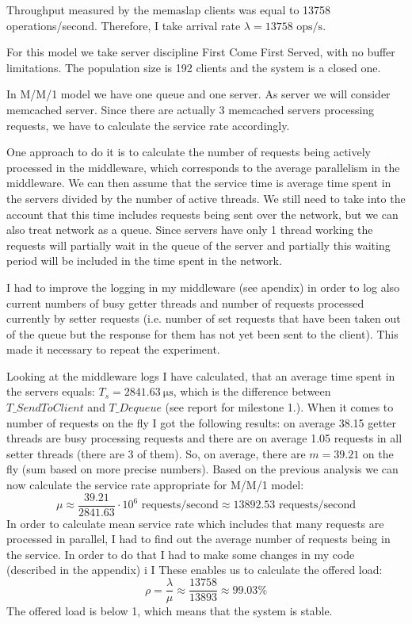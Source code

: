 \documentclass[11pt]{article}
\begin{document}
Throughput measured by the memaslap clients was equal to 13758 operations/second. Therefore, I take arrival rate $\lambda = 13758 \textrm{ ops/s}$.

For this model we take server discipline First Come First Served, with no buffer limitations. The population size is 192 clients and the system is a closed one.

In M/M/1 model we have one queue and one server. As server we will consider memcached server. Since there are actually 3 memcached servers processing requests, we have to calculate the service rate accordingly.

One approach to do it is to calculate the number of requests being actively processed in the middleware, which corresponds to the average parallelism in the middleware. We can then assume that the service time is average time spent in the servers divided by the number of active threads. We still need to take into the account that this time includes requests being sent over the network, but we can also treat network as a queue. Since servers have only 1 thread working the requests will partially wait in the queue of the server and partially this waiting period will be included in the time spent in the network.

I had to improve the logging in my middleware (see apendix) in order to log also current numbers of busy getter threads and number of requests processed currently by setter requests (i.e. number of set requests that have been taken out of the queue but the response for them has not yet been sent to the client). This made it necessary to repeat the experiment.

Looking at the middleware logs I have calculated, that an average time spent in the servers equals: $T_s = \SI{2841.63}{\micro\second}$, which is the difference between $T\_SendToClient$ and $T\_Dequeue$ (see report for milestone 1.). When it comes to number of requests on the fly I got the following results: on average 38.15 getter threads are busy processing requests and there are on average 1.05 requests in all setter threads (there are 3 of them). So, on average, there are $m = 39.21$ on the fly (sum based on more precise numbers). Based on the previous analysis we can now calculate the service rate appropriate for M/M/1 model:
$$\mu \approx \frac{39.21}{2841.63} \cdot 10^6 \textrm{ requests/second} \approx 13892.53 \textrm{ requests/second}$$
In order to calculate mean service rate which includes that many requests are processed in parallel, I had to find out the average number of requests being in the service. In order to do that I had to make some changes in my code (described in the appendix) i I These enables us to calculate the offered load:
$$\rho = \frac{\lambda}{\mu} \approx \frac{13758}{13893} \approx 99.03\%$$
The offered load is below 1, which means that the system is stable.
\end{document}
